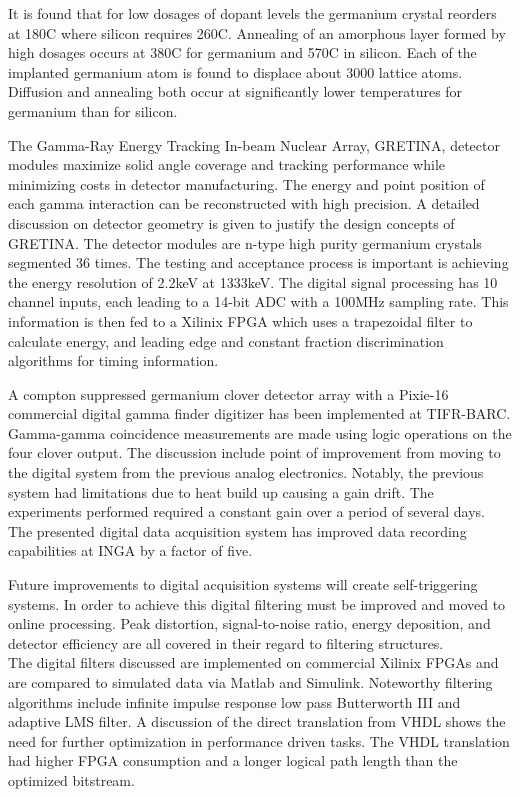 \documentclass[12pt]{article}
\begin{document}
\begin{doublespacing}
It is found that for low dosages of dopant levels the germanium crystal reorders at 180C where silicon requires 260C.
Annealing of an amorphous layer formed by high dosages occurs at 380C for germanium and 570C in silicon.
Each of the implanted germanium atom is found to displace about 3000 lattice atoms.
Diffusion and annealing both occur at significantly lower temperatures for germanium than for silicon.


{\large\textbf{\cite{Paschalis201344}}}
The Gamma-Ray Energy Tracking In-beam Nuclear Array, GRETINA, detector modules maximize solid angle coverage and tracking performance while minimizing costs in detector manufacturing.
The energy and point position of each gamma interaction can be reconstructed with high precision.
A detailed discussion on detector geometry is given to justify the design concepts of GRETINA.
The detector modules are n-type high purity germanium crystals segmented 36 times.
The testing and acceptance process is important is achieving the energy resolution of 2.2keV at 1333keV.
The digital signal processing has 10 channel inputs, each leading to a 14-bit ADC with a 100MHz sampling rate.
This information is then fed to a Xilinix FPGA which uses a trapezoidal filter to calculate energy, and leading edge and constant fraction discrimination algorithms for timing information.


{\large\textbf{\cite{Palit201290}}}
A compton suppressed germanium clover detector array with a Pixie-16 commercial digital gamma finder digitizer has been implemented at TIFR-BARC.
Gamma-gamma coincidence measurements are made using logic operations on the four clover output.
The discussion include point of improvement from moving to the digital system from the previous analog electronics.
Notably, the previous system had limitations due to heat build up causing a gain drift.
The experiments performed required a constant gain over a period of several days.
The presented digital data acquisition system has improved data recording capabilities at INGA by a factor of five.


{\large\textbf{\cite{Alberto200999}}}
Future improvements to digital acquisition systems will create self-triggering systems.
In order to achieve this digital filtering must be improved and moved to online processing.
Peak distortion, signal-to-noise ratio, energy deposition, and detector efficiency are all covered in their regard to filtering structures.
\\

The digital filters discussed are implemented on commercial Xilinix FPGAs and are compared to simulated data via Matlab and Simulink.
Noteworthy filtering algorithms include infinite impulse response low pass Butterworth III and adaptive LMS filter.
A discussion of the direct translation from VHDL shows the need for further optimization in performance driven tasks.
The VHDL translation had higher FPGA consumption and a longer logical path length than the optimized bitstream.



\end{doublespacing}
\end{document}

